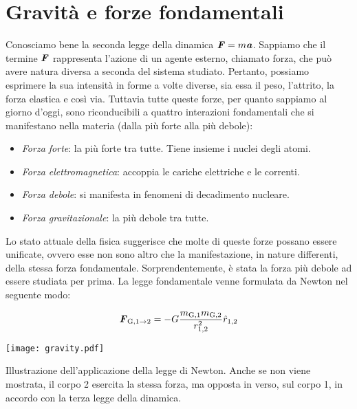 \marginpar{\minitoc}

\section{Gravità e forze fondamentali}
Conosciamo bene la seconda legge della dinamica $\textbf{\textit{F}} = m\textbf{\textit{a}}$.
Sappiamo che il termine $\textbf{\textit{F}}$ rappresenta l'azione di un agente esterno,
chiamato forza, che può avere natura diversa a seconda del sistema studiato.
Pertanto, possiamo esprimere
la sua intensità in forme a volte diverse, sia essa il peso, l'attrito, la
forza elastica e così via. Tuttavia tutte queste forze, per quanto sappiamo al
giorno d'oggi, sono riconducibili a quattro interazioni fondamentali che si
manifestano nella materia (dalla più forte alla più debole):
\begin{itemize}
    \item \textit{Forza forte}: la più forte tra tutte. Tiene insieme i nuclei
    degli atomi.

    \item \textit{Forza elettromagnetica}: accoppia le cariche elettriche e
    le correnti.

    \item \textit{Forza debole}: si manifesta in fenomeni di decadimento nucleare.
    
    \item \textit{Forza gravitazionale}: la più debole tra tutte.
\end{itemize}
Lo stato attuale della fisica suggerisce che molte di queste forze possano essere
unificate, ovvero esse non sono altro che la manifestazione, in nature differenti,
della stessa forza fondamentale.
Sorprendentemente, è stata la forza più debole ad essere studiata per prima.
La legge fondamentale venne formulata da Newton nel seguente modo:


\begin{align}
    \textbf{\textit{F}}_{\text{G}, 1\to 2} = -G\frac{m_{\text{G},1}m_{\text{G},2}}{r^2_{1,2}}\hat{r}_{1,2}\label{gravity}
\end{align}

\begin{marginfigure}
    \centering
    \texttt{[image: gravity.pdf]}
    \caption{Illustrazione dell'applicazione della legge di Newton.
    Anche se non viene mostrata, il corpo 2 esercita la stessa
    forza, ma opposta in verso, sul corpo 1, in accordo con la
    terza legge della dinamica.}
    \label{gravitescionalfors}
\end{marginfigure}

